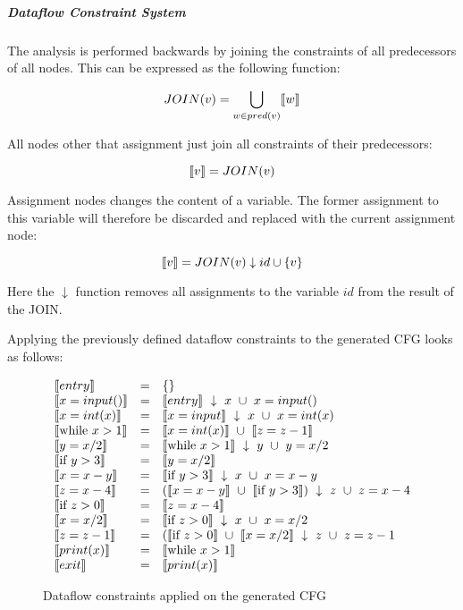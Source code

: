 \subparagraph{Dataflow Constraint System}
The analysis is performed backwards by joining the constraints of all predecessors of all nodes.
This can be expressed as the following function:

\[ JOIN(v) = \bigcup_{ w \in pred(v)} \llbracket w \rrbracket \]

All nodes other that assignment just join all constraints of their predecessors:

\[ \llbracket v \rrbracket = JOIN(v) \]

Assignment nodes changes the content of a variable.
The former assignment to this variable will therefore be discarded and replaced with the current assignment node:

\[ \llbracket v \rrbracket = JOIN(v) \downarrow id \cup \{ v \} \]

Here the $\downarrow$ function removes all assignments to the variable $id$ from the result of the JOIN.

Applying the previously defined dataflow constraints to the generated CFG looks as follows:

\begin{figure}[H]
\[
\begin{array}{lcl}
  \llbracket entry \rrbracket & = & \{\}\\
  \llbracket x = input() \rrbracket & = & \llbracket entry \rrbracket ~ \downarrow ~ x ~ \cup ~ x = input()\\
  \llbracket x = int(x) \rrbracket & = & \llbracket x = input \rrbracket ~ \downarrow ~ x ~ \cup ~ x = int(x)\\
  \llbracket \text{while } x > 1 \rrbracket & = & \llbracket x = int(x) \rrbracket ~ \cup ~ \llbracket z = z - 1 \rrbracket\\
  \llbracket  y = x / 2 \rrbracket & = & \llbracket \text{while } x > 1 \rrbracket ~ \downarrow ~ y ~ \cup ~ y = x / 2\\
  \llbracket \text{if } y > 3 \rrbracket & = & \llbracket  y = x / 2 \rrbracket\\
  \llbracket  x = x-y \rrbracket & = & \llbracket \text{if } y > 3 \rrbracket ~ \downarrow ~ x ~ \cup ~ x = x-y\\
  \llbracket  z = x-4 \rrbracket & = & (\llbracket x = x-y \rrbracket ~ \cup ~ \llbracket \text{if } y > 3 \rrbracket) ~ \downarrow ~ z ~ \cup ~ z = x-4\\
  \llbracket \text{if } z > 0 \rrbracket & = & \llbracket z = x - 4 \rrbracket\\
  \llbracket x = x / 2 \rrbracket & = & \llbracket \text{if } z > 0 \rrbracket ~ \downarrow ~ x ~ \cup ~ x = x/2\\
  \llbracket z = z - 1 \rrbracket & = & (\llbracket \text{if } z > 0 \rrbracket ~ \cup ~ \llbracket x = x / 2 \rrbracket ~ \downarrow ~ z ~ \cup ~ z = z - 1\\
  \llbracket print(x) \rrbracket & = & \llbracket \text{while } x > 1 \rrbracket\\
  \llbracket exit \rrbracket & = & \llbracket print(x) \rrbracket
\end{array}
\]
\caption{Dataflow constraints applied on the generated CFG}
\end{figure}

